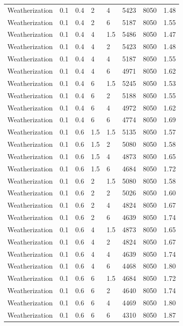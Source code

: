 \begin{table}
\begin{tabular}{llllllll}
		Weatherization & 0.1 & 0.4 & 2 & 4 & 5423 & 8050 & 1.48 \\
		Weatherization & 0.1 & 0.4 & 2 & 6 & 5187 & 8050 & 1.55 \\
		Weatherization & 0.1 & 0.4 & 4 & 1.5 & 5486 & 8050 & 1.47 \\
		Weatherization & 0.1 & 0.4 & 4 & 2 & 5423 & 8050 & 1.48 \\
		Weatherization & 0.1 & 0.4 & 4 & 4 & 5187 & 8050 & 1.55 \\
		Weatherization & 0.1 & 0.4 & 4 & 6 & 4971 & 8050 & 1.62 \\
		Weatherization & 0.1 & 0.4 & 6 & 1.5 & 5245 & 8050 & 1.53 \\
		Weatherization & 0.1 & 0.4 & 6 & 2 & 5188 & 8050 & 1.55 \\
		Weatherization & 0.1 & 0.4 & 6 & 4 & 4972 & 8050 & 1.62 \\
		Weatherization & 0.1 & 0.4 & 6 & 6 & 4774 & 8050 & 1.69 \\
		Weatherization & 0.1 & 0.6 & 1.5 & 1.5 & 5135 & 8050 & 1.57 \\
		Weatherization & 0.1 & 0.6 & 1.5 & 2 & 5080 & 8050 & 1.58 \\
		Weatherization & 0.1 & 0.6 & 1.5 & 4 & 4873 & 8050 & 1.65 \\
		Weatherization & 0.1 & 0.6 & 1.5 & 6 & 4684 & 8050 & 1.72 \\
		Weatherization & 0.1 & 0.6 & 2 & 1.5 & 5080 & 8050 & 1.58 \\
		Weatherization & 0.1 & 0.6 & 2 & 2 & 5026 & 8050 & 1.60 \\
		Weatherization & 0.1 & 0.6 & 2 & 4 & 4824 & 8050 & 1.67 \\
		Weatherization & 0.1 & 0.6 & 2 & 6 & 4639 & 8050 & 1.74 \\
		Weatherization & 0.1 & 0.6 & 4 & 1.5 & 4873 & 8050 & 1.65 \\
		Weatherization & 0.1 & 0.6 & 4 & 2 & 4824 & 8050 & 1.67 \\
		Weatherization & 0.1 & 0.6 & 4 & 4 & 4639 & 8050 & 1.74 \\
		Weatherization & 0.1 & 0.6 & 4 & 6 & 4468 & 8050 & 1.80 \\
		Weatherization & 0.1 & 0.6 & 6 & 1.5 & 4684 & 8050 & 1.72 \\
		Weatherization & 0.1 & 0.6 & 6 & 2 & 4640 & 8050 & 1.74 \\
		Weatherization & 0.1 & 0.6 & 6 & 4 & 4469 & 8050 & 1.80 \\
		Weatherization & 0.1 & 0.6 & 6 & 6 & 4310 & 8050 & 1.87 \\
		\bottomrule
	\end{tabular}
\end{table}

